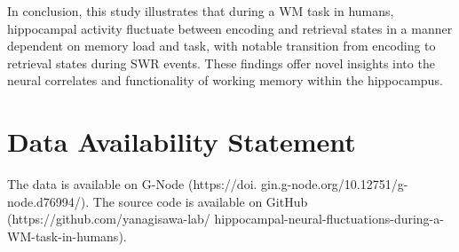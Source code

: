 \documentclass[preprint,review,12pt]{elsarticle}%
\newcommand{\hl}[1]{\colorbox{yellow}{#1}}
\newcommand{\hlref}[1]{%
  \ifnum\getrefnumber{#1}=0
    \hl{\ref*{#1}}%
  \else
    \ref{#1}%
  \fi
}
\begin{document}
\indent
In conclusion, this study illustrates that during a WM task in humans, hippocampal activity fluctuate between encoding and retrieval states in a manner dependent on memory load and task, with notable transition from encoding to retrieval states during SWR events. These findings offer novel insights into the neural correlates and functionality of working memory within the hippocampus.
\label{sec:discussion}






\section*{Data Availability Statement}
The data is available on G-Node (https://doi. gin.g-node.org/10.12751/g-node.d76994/). The source code is available on GitHub (https://github.com/yanagisawa-lab/ hippocampal-neural-fluctuations-during-a-WM-task-in-humans).
\label{data and code availability}
\end{document}
